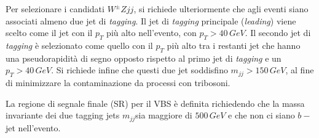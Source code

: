 \documentclass[11pt]{article}
\newcommand{\mjj}{\ensuremath{m_{jj}}}
\begin{document}
Per selezionare i candidati $W^\pm Zjj$, si richiede ulteriormente che agli eventi siano associati almeno due jet di \textit{tagging}. Il jet di \textit{tagging} principale (\textit{leading}) viene scelto come il jet con il $p_T$ più alto nell'evento, con $p_T > 40\,\unit{GeV}$. Il secondo jet di \textit{tagging} è selezionato come quello con il $p_T$ più alto tra i restanti jet che hanno una pseudorapidità di segno opposto rispetto al primo jet di \textit{tagging} e un $p_T > 40\,\unit{GeV}$. Si richiede infine che questi due jet soddisfino $m_{jj} > 150\,\unit{GeV}$, al fine di minimizzare la contaminazione da processi con tribosoni.

La regione di segnale finale (SR) per il VBS è definita richiedendo che la massa invariante dei due tagging jets \mjj sia maggiore di $500\,\unit{GeV}$ e che non ci siano $b-$jet nell'evento.
\end{document}
